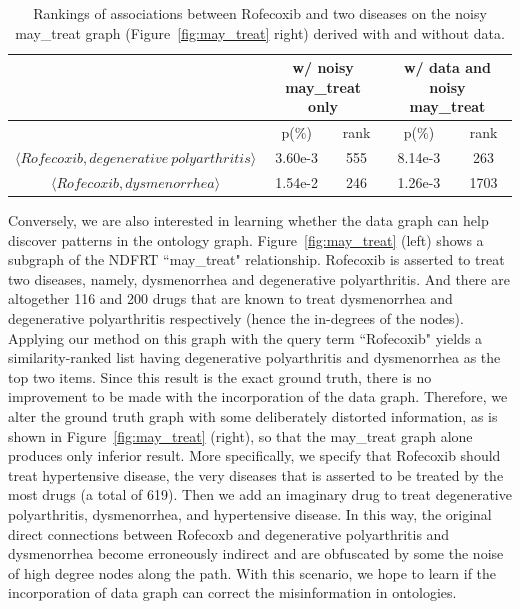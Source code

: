 \begin{table}[tbh]\scriptsize
\begin{center}
\begin{tabular}{ c || c  c || c  c }
\hline
        &   \multicolumn{2}{c||}{w/ noisy may\_treat only}    &   \multicolumn{2}{c}{w/ data and noisy may\_treat}\\
\hline
\hline
       	&   p(\%)   &   rank    &  p(\%)    &    rank    \\
\hline
$\langle Rofecoxib, degenerative~polyarthritis\rangle$       &   3.60e-3   &   555     &   8.14e-3    &   263    \\
$\langle Rofecoxib, dysmenorrhea\rangle$    &   1.54e-2   &   246     &   1.26e-3    &   1703   \\
\hline
\end{tabular}
\end{center}
\caption[Rankings of associations on the noisy may\_treat graph]{\label{tbl:salted_may_treat}Rankings of associations between Rofecoxib and two diseases on the noisy may\_treat graph (Figure~\ref{fig:may_treat} right) derived with and without data.}
\end{table}

Conversely, we are also interested in learning whether the data graph can help discover patterns in the ontology graph. Figure~\ref{fig:may_treat} (left) shows a subgraph of the NDFRT ``may\_treat" relationship. Rofecoxib is asserted to treat two diseases, namely, dysmenorrhea and degenerative polyarthritis. And there are altogether 116 and 200 drugs that are known to treat dysmenorrhea and degenerative polyarthritis respectively (hence the in-degrees of the nodes). Applying our method on this graph with the query term ``Rofecoxib" yields a similarity-ranked list having degenerative polyarthritis and dysmenorrhea as the top two items. Since this result is the exact ground truth, there is no improvement to be made with the incorporation of the data graph. Therefore, we alter the ground truth graph with some deliberately distorted information, as is shown in Figure~\ref{fig:may_treat} (right), so that the may\_treat graph alone produces only inferior result. More specifically, we specify that Rofecoxib should treat hypertensive disease, the very diseases that is asserted to be treated by the most drugs (a total of 619). Then we add an imaginary drug to treat degenerative polyarthritis, dysmenorrhea, and hypertensive disease. In this way, the original direct connections between Rofecoxb and degenerative polyarthritis and dysmenorrhea become erroneously indirect and are obfuscated by some the noise of high degree nodes along the path. With this scenario, we hope to learn if the incorporation of data graph can correct the misinformation in ontologies.


